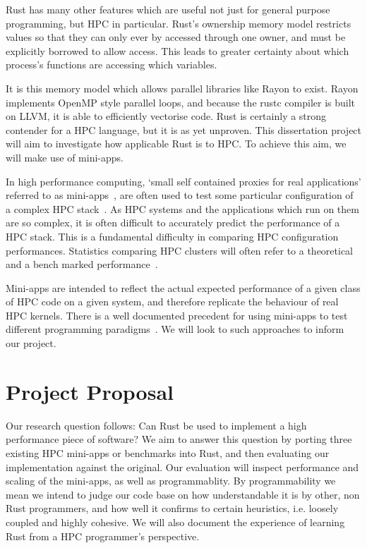 \documentclass{report}[a4]
\begin{document}
Rust has many other features which are useful not just for general purpose programming, but HPC in particular. Rust's ownership memory model restricts values so that they can only ever by accessed through one owner, and must be explicitly borrowed to allow access. This leads to greater certainty about which process's functions are accessing which variables.

It is this memory model which allows parallel libraries like Rayon to exist. Rayon implements OpenMP style parallel loops, and because the rustc compiler is built on LLVM, it is able to efficiently vectorise code. Rust is certainly a strong contender for a HPC language, but it is as yet unproven. This dissertation project will aim to investigate how applicable Rust is to HPC. To achieve this aim, we will make use of mini-apps.

In high performance computing, `small self contained proxies for real applications' referred to as mini-apps~\cite{heroux2009improving}, are often used to test some particular configuration of a complex HPC stack~\cite{Mallinson:2014, Slaughter:2015, martineau2017arch}. As HPC systems and the applications which run on them are so complex, it is often difficult to accurately predict the performance of a HPC stack. This is a fundamental difficulty in comparing HPC configuration performances. Statistics comparing HPC clusters will often refer to a theoretical and a bench marked performance~\cite{top500}.

Mini-apps are intended to reflect the actual expected performance of a given class of HPC code on a given system, and therefore replicate the behaviour of real HPC kernels. There is a well documented precedent for using mini-apps to test different programming paradigms~\cite{Mallinson:2014, Slaughter:2015}. We will look to such approaches to inform our project.

\chapter{Project Proposal} %

Our research question follows: Can Rust be used to implement a high performance piece of software? We aim to answer this question by porting three existing HPC mini-apps or benchmarks into Rust, and then evaluating our implementation against the original. Our evaluation will inspect performance and scaling of the mini-apps, as well as programmablity. By programmability we mean we intend to judge our code base on how understandable it is by other, non Rust programmers, and how well it confirms to certain heuristics, i.e. loosely coupled and highly cohesive. We will also document the experience of learning Rust from a HPC programmer's perspective.
\end{document}
